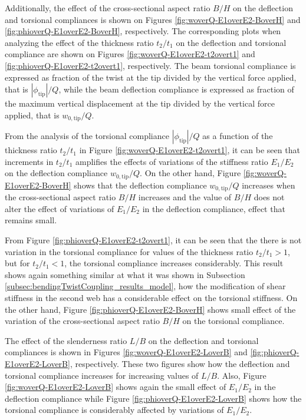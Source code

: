     Additionally, the effect of the cross-sectional aspect ratio $B/H$ on the deflection and torsional compliances is shown on Figures \ref{fig:woverQ-E1overE2-BoverH} and \ref{fig:phioverQ-E1overE2-BoverH}, respectively. The corresponding plots when analyzing the effect of the thickness ratio $t_2/t_1$ on the deflection and torsional compliance are shown on Figures \ref{fig:woverQ-E1overE2-t2overt1} and \ref{fig:phioverQ-E1overE2-t2overt1}, respectively. The beam torsional compliance is expressed as fraction of the twist at the tip divided by the vertical force applied, that is $|\phi_{\mathrm{tip}}| / Q$, while the beam deflection compliance is expressed as fraction of the maximum vertical displacement at the tip divided by the vertical force applied, that is $w_{\mathrm{0,tip}} / Q$.

    From the analysis of the torsional compliance $|\phi_{\mathrm{tip}}| / Q$ as a function of the thickness ratio $t_2/t_1$ in Figure \ref{fig:woverQ-E1overE2-t2overt1}, it can be seen that increments in $t_2/t_1$ amplifies the effects of variations of the stiffness ratio $E_1/E_2$ on the deflection compliance $w_{\mathrm{0,tip}} / Q$. On the other hand, Figure \ref{fig:woverQ-E1overE2-BoverH} shows that the deflection compliance $w_{\mathrm{0,tip}} / Q$ increases when the cross-sectional aspect ratio $B/H$ increases and the value of $B/H$ does not alter the effect of variations of $E_1/E_2$ in the deflection compliance, effect that remains small.

    From Figure \ref{fig:phioverQ-E1overE2-t2overt1}, it can be seen that the there is not variation in the torsional compliance for values of the thickness ratio $t_2/t_1 > 1$, but for $t_2/t_1 < 1$, the torsional compliance increases considerably. This result shows again something similar at what it was shown in Subsection \ref{subsec:bendingTwistCoupling_results_model}, how the modification of shear stiffness in the second web has a considerable effect on the torsional stiffness. On the other hand, Figure \ref{fig:phioverQ-E1overE2-BoverH} shows small effect of the variation of the cross-sectional aspect ratio $B/H$ on the torsional compliance.

    The effect of the slenderness ratio $L/B$ on the deflection and torsional compliances is shown in Figures \ref{fig:woverQ-E1overE2-LoverB} and \ref{fig:phioverQ-E1overE2-LoverB}, respectively. These two figures show how the deflection and torsional compliance increases for increasing values of $L/B$. Also, Figure \ref{fig:woverQ-E1overE2-LoverB} shows again the small effect of $E_1/E_2$ in the deflection compliance while Figure \ref{fig:phioverQ-E1overE2-LoverB} shows how the torsional compliance is considerably affected by variations of $E_1/E_2$.


